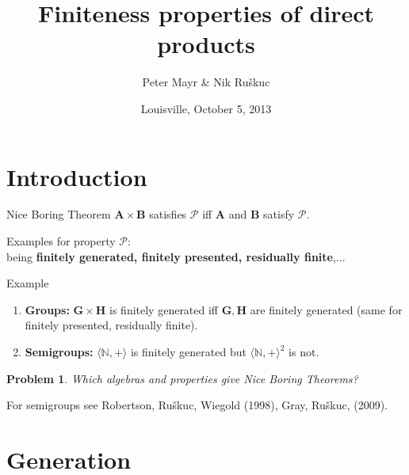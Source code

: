 \documentclass{beamer}
\title[Direct products]{Finiteness properties of direct products}
\author{Peter Mayr \& Nik Ru\v{s}kuc}
\date{Louisville, October 5, 2013}
\institute{JKU Linz, Austria \\ University of St Andrews, UK }
\newtheorem{que}[thm]{Problem}
\theoremstyle{definition}
\newcommand{\algop}[2]{\langle {#1}, {#2} \rangle}
\newcommand{\A}{{\mathbf A}}
\newcommand{\B}{{\mathbf B}}
\newcommand{\G}{{\mathbf G}}
\renewcommand{\H}{{\mathbf H}}
\renewcommand{\P}{{\mathcal P}}
\newcommand{\N}{{\mathbb N}}
\begin{document}
\begin{frame}
\titlepage
\end{frame}



\section{Introduction}

\begin{frame}
 
\begin{block}{Nice Boring Theorem}
 $\A\times\B$ satisfies $\P$ iff $\A$ and $\B$ satisfy $\P$.
\end{block}

 Examples for property $\P$: \\
 being {\bf finitely generated, finitely presented, residually finite},...

\bigskip

\begin{block}{Example}
\begin{enumerate}
\item
 {\bf Groups:} $\G\times\H$ is finitely generated iff $\G,\H$ are finitely generated
 (same for finitely presented, residually finite).
\item
 {\bf Semigroups:} $\algop{\N}{+}$ is finitely generated but $\algop{\N}{+}^2$ is not.
\end{enumerate}
\end{block}


\begin{que}
{\color{red} Which algebras and properties give Nice Boring Theorems?}
\end{que}
 For semigroups see Robertson, Ru\v{s}kuc, Wiegold (1998), Gray, Ru\v{s}kuc, (2009).

\end{frame}


\section{Generation}
\end{document}
